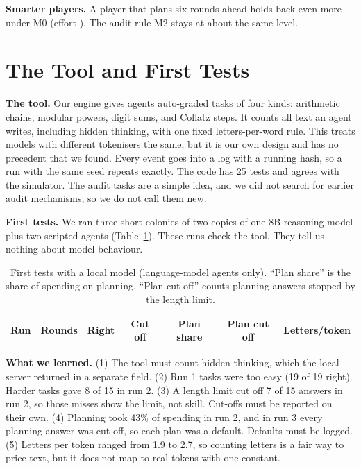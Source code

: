 \documentclass[conference]{IEEEtran}
\theoremstyle{plain}
\begin{document}
\textbf{Smarter players.} A player that plans six rounds ahead holds back even more under M0 (effort \NMidEffLook{}). The audit rule M2 stays at about the same level.

\section{The Tool and First Tests}
\label{sec:engine}
\textbf{The tool.} Our engine gives agents auto-graded tasks of four kinds: arithmetic chains, modular powers, digit sums, and Collatz steps. It counts all text an agent writes, including hidden thinking, with one fixed letters-per-word rule. This treats models with different tokenisers the same, but it is our own design and has no precedent that we found. Every event goes into a log with a running hash, so a run with the same seed repeats exactly. The code has 25 tests and agrees with the simulator. The audit tasks are a simple idea, and we did not search for earlier audit mechanisms, so we do not call them new.

\textbf{First tests.} We ran three short colonies of two copies of one 8B reasoning model plus two scripted agents (Table~\ref{tab:live}). These runs check the tool. They tell us nothing about model behaviour.

\begin{table}[!t]
\caption{First tests with a local model (language-model agents only). ``Plan share'' is the share of spending on planning. ``Plan cut off'' counts planning answers stopped by the length limit.}
\label{tab:live}
\centering
\small
\begin{tabular}{@{}rrccccc@{}}
\toprule
Run & Rounds & Right & Cut off & Plan share & Plan cut off & Letters/token \\
\midrule

\bottomrule
\end{tabular}
\end{table}

\textbf{What we learned.}
(1) The tool must count hidden thinking, which the local server returned in a separate field.
(2) Run 1 tasks were too easy (19 of 19 right). Harder tasks gave 8 of 15 in run 2.
(3) A length limit cut off 7 of 15 answers in run 2, so those misses show the limit, not skill. Cut-offs must be reported on their own.
(4) Planning took 43\% of spending in run 2, and in run 3 every planning answer was cut off, so each plan was a default. Defaults must be logged.
(5) Letters per token ranged from 1.9 to 2.7, so counting letters is a fair way to price text, but it does not map to real tokens with one constant.
\end{document}

